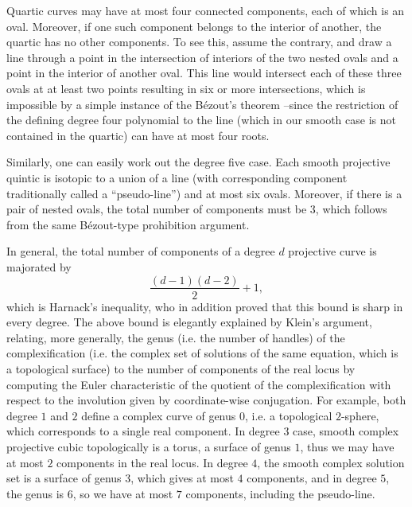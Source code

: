 \documentclass[pdflatex,sn-mathphys-num]{sn-jnl}%
\theoremstyle{thmstyleone}%
\theoremstyle{thmstyletwo}%
\theoremstyle{thmstylethree}%
\begin{document}
Quartic curves may have at most four connected components, each of which is an oval. Moreover, if one such component belongs to the interior of another, the quartic has no other components. To see this, assume the contrary, and draw a line through a point in the intersection of interiors of the two nested ovals and a point in the interior of another oval. This line would intersect each of these three ovals at at least two points resulting in six or more intersections, which is impossible by a simple instance of the Bézout's theorem --since the restriction of the defining degree four polynomial to the line (which in our smooth case is not contained in the quartic) can have at most four roots.

Similarly, one can easily work out the degree five case. Each smooth projective quintic is isotopic to a union of a line (with corresponding component traditionally called a “pseudo-line”) and at most six ovals. Moreover, if there is a pair of nested ovals, the total number of components must be 3, which follows from the same B\'ezout-type prohibition argument. 

In general, the total number of components of a degree $d$ projective curve is majorated by $$\dfrac{(d-1)(d-2)}{2}+1,$$ which is Harnack's inequality, who in addition proved that this bound is sharp in every degree. The above bound is elegantly explained by Klein's argument, relating, more generally, the genus (i.e. the number of handles) of the complexification (i.e. the complex set of solutions of the same equation, which is a topological surface) to the number of components of the real locus by computing the Euler characteristic of the quotient of the complexification with respect to the involution given by coordinate-wise conjugation. For example, both degree $1$ and $2$ define a complex curve of genus $0$, i.e. a topological $2$-sphere, which corresponds to a single real component. In degree $3$ case, smooth complex projective cubic topologically is a torus, a surface of genus $1$, thus we may have at most $2$ components in the real locus. In degree $4$, the smooth complex solution set is a surface of genus $3$, which gives at most $4$ components, and in degree $5$, the genus is $6$, so we have at most $7$ components, including the pseudo-line.
\end{document}
